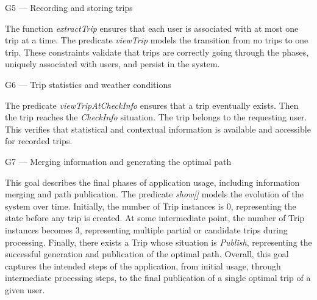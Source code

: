 G5 — Recording and storing trips

The function \textit{extractTrip} ensures that each user is associated with at most one trip at a time. The predicate \textit{viewTrip} models the transition from no trips to one trip. These constraints validate that trips are correctly going through the phases, uniquely associated with users, and persist in the system.

G6 — Trip statistics and weather conditions

The predicate \textit{viewTripAtCheckInfo} ensures that a trip eventually exists. Then the trip reaches the \textit{CheckInfo} situation. The trip belongs to the requesting user. This verifies that statistical and contextual information is available and accessible for recorded trips.

G7 — Merging information and generating the optimal path

This goal describes the final phases of application usage, including information merging and path publication. The predicate \textit{show[]} models the evolution of the system over time. Initially, the number of Trip instances is 0, representing the state before any trip is created. At some intermediate point, the number of Trip instances becomes 3, representing multiple partial or candidate trips during processing. Finally, there exists a Trip whose situation is \textit{Publish}, representing the successful generation and publication of the optimal path. Overall, this goal captures the intended steps of the application, from initial usage, through intermediate processing steps, to the final publication of a single optimal trip of a given user.

